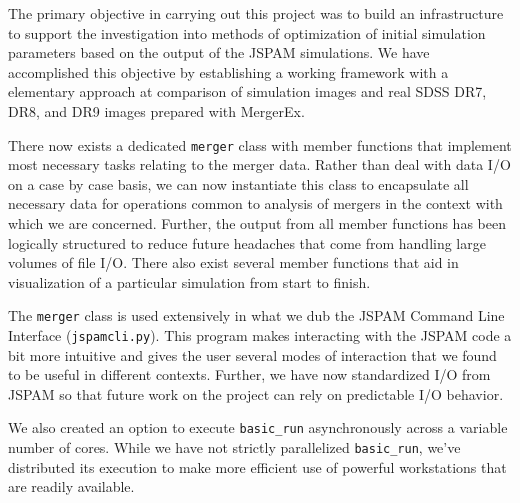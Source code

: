 The primary objective in carrying out this project was to build an
infrastructure to support the investigation into methods of
optimization of initial simulation parameters based on the output of the
JSPAM simulations.
We have accomplished this objective by establishing a working framework with a
elementary approach at comparison of simulation images and real SDSS DR7, DR8,
and DR9 images prepared with MergerEx.

There now exists a dedicated
\texttt{merger} class with member functions that implement most necessary tasks
relating to the merger data. Rather than deal with data I/O on a case by case
basis, we can now instantiate this class to encapsulate all necessary data for
operations common to analysis of mergers in the context with which we are
concerned. Further, the output from all member functions has been logically
structured to reduce future headaches that come from handling large volumes
of file I/O. There also exist several member functions that aid in visualization
of a particular simulation from start to finish.

The \texttt{merger} class is used extensively in what we dub the JSPAM Command
Line Interface (\texttt{jspamcli.py}). This program makes interacting with
the JSPAM code a bit more intuitive and gives the user several modes of
interaction that we found to be useful in different contexts. Further, we have
now standardized I/O from JSPAM so that future work on the project can rely on
predictable I/O behavior.

We also created an option to execute \texttt{basic\_run} asynchronously across
a variable number of cores. While we have not strictly parallelized
\texttt{basic\_run}, we've distributed its execution to make more efficient use
of powerful workstations that are readily available.
